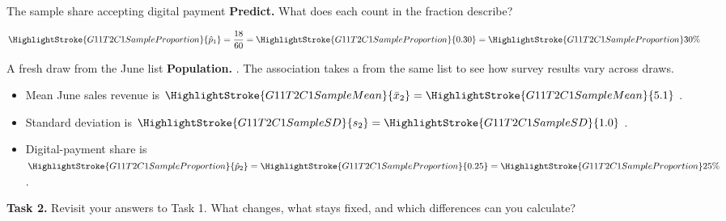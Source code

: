 \documentclass[12pt,aspectratio=169]{beamer}
\begin{document}
\begin{frame}[t]{The sample share accepting digital payment}
  \textbf{Predict.} What does each count in the fraction describe?

  \[
    \HighlightStroke{G11T2C1SampleProportion}{\hat{p}_{1}}
    =\frac{18}{60}
    =\HighlightStroke{G11T2C1SampleProportion}{0.30}
    =\HighlightStroke{G11T2C1SampleProportion}{30\%}
  \]

  \par
  \medskip
  \par
  \medskip
\end{frame}

\begin{frame}[t]{A fresh draw from the June list}
  \textbf{Population.} .
  The association takes a 
  from the same list to see how survey results vary across draws.

  \medskip
  \begin{itemize}
    \item Mean June sales revenue is
      $\HighlightStroke{G11T2C1SampleMean}{\bar{x}_{2}}
      =\HighlightStroke{G11T2C1SampleMean}{5.1}$ .
    \item Standard deviation is
      $\HighlightStroke{G11T2C1SampleSD}{s_{2}}
      =\HighlightStroke{G11T2C1SampleSD}{1.0}$ .
    \item Digital-payment share is
      $\HighlightStroke{G11T2C1SampleProportion}{\hat{p}_{2}}
      =\HighlightStroke{G11T2C1SampleProportion}{0.25}
      =\HighlightStroke{G11T2C1SampleProportion}{25\%}$.
  \end{itemize}

  \bigskip
  \textbf{Task 2.} Revisit your answers to Task 1. What changes, what stays
  fixed, and which differences can you calculate?
\end{frame}
\end{document}
